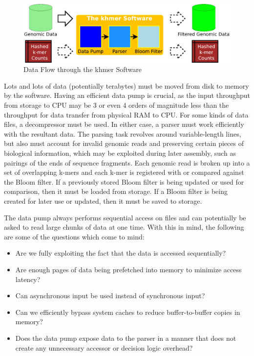 \documentclass{article}
\begin{document}
\begin{figure}[ht!]
\centering
\includegraphics[scale=0.4]{data_flow.pdf}
\caption{Data Flow through the khmer Software}
\label{khmerDataFlow}
\end{figure}

Lots and lots of data (potentially terabytes) must be moved from disk to memory
by the software. Having an efficient data pump is crucial, as the input
throughput from storage to CPU may be 3 or even 4 orders of magnitude less than
the throughput for data transfer from physical RAM to CPU. For some kinds of
data files, a decompressor must be used. In either case, a parser must work
efficiently with the resultant data. The parsing task revolves around
variable-length lines, but also must account for invalid genomic reads and
preserving certain pieces of biological information, which may be exploited
during later assembly, such as pairings of the ends of sequence fragments. Each
genomic read is broken up into a set of overlapping k-mers and each k-mer is
registered with or compared against the Bloom filter.  If a previously stored
Bloom filter is being updated or used for comparison, then it must be loaded
from storage.  If a Bloom filter is being created for later use or updated,
then it must be saved to storage.

The data pump always performs sequential access on files and can potentially be
asked to read large chunks of data at one time. With this in mind, the
following are some of the questions which come to mind:
\begin{itemize}
\item Are we fully exploiting the fact that the data is accessed sequentially?
\item Are enough pages of data being prefetched into memory to minimize access
latency?
\item Can asynchronous input be used instead of synchronous input?
\item Can we efficiently bypass system caches to reduce buffer-to-buffer copies
in memory?
\item Does the data pump expose data to the parser in a manner that
does not create any unnecessary accessor or decision logic overhead?
\end{itemize}
\end{document}
